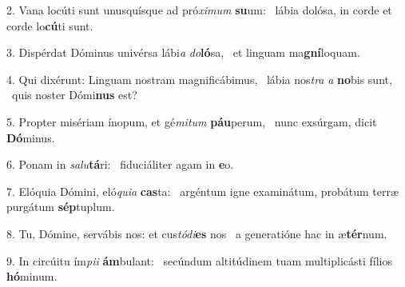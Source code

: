 2. Vana locúti sunt unusquísque ad pró\textit{xi}\textit{mum} \textbf{su}um: \ast\  lábia dolósa, in corde et corde lo\textbf{cú}ti sunt.\

3. Dispérdat Dóminus univérsa lábi\textit{a} \textit{do}\textbf{ló}sa, \ast\  et linguam ma\textbf{gní}loquam.\

4. Qui dixérunt: Linguam nostram magnificábimus, \dag\  lábia nos\textit{tra} \textit{a} \textbf{no}bis sunt, \ast\  quis noster Dómi\textbf{nus} est?\

5. Propter misériam ínopum, et gé\textit{mi}\textit{tum} \textbf{páu}perum, \ast\  nunc exsúrgam, dicit \textbf{Dó}minus.\

6. Ponam in \textit{sa}\textit{lu}\textbf{tá}ri: \ast\  fiduciáliter agam in \textbf{e}o.\

7. Elóquia Dómini, eló\textit{qui}\textit{a} \textbf{cas}ta: \ast\  argéntum igne examinátum, probátum terræ purgátum \textbf{sép}tuplum.\

8. Tu, Dómine, servábis nos: et cus\textit{tó}\textit{di}\textbf{es} nos \ast\  a generatióne hac in æ\textbf{tér}num.\

9. In circúitu ím\textit{pi}\textit{i} \textbf{ám}bulant: \ast\  secúndum altitúdinem tuam multiplicásti fílios \textbf{hó}minum.\

